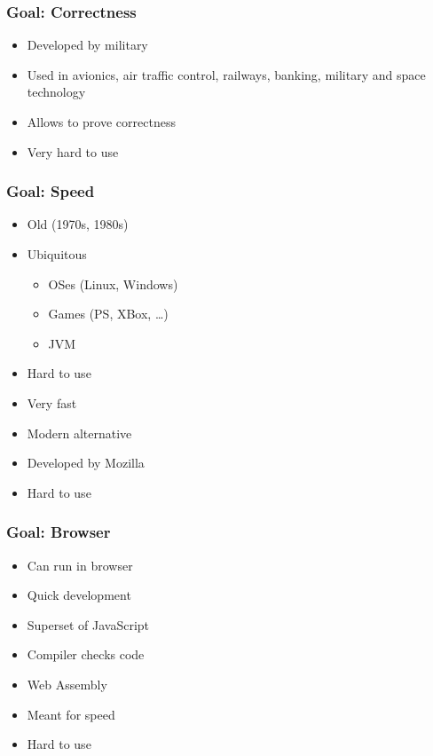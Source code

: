 \begin{frame}
  \frametitle{Goal: Correctness}
  \begin{itemize}
    \item Developed by military
    \item Used in avionics, air traffic control, railways, banking, military and space technology
  \end{itemize}
  \vskip2mm
  \begin{itemize}
    \item Allows to prove correctness
    \item Very hard to use
  \end{itemize}
\end{frame}

\begin{frame}
  \frametitle{Goal: Speed}
  \begin{itemize}
    \item Old (1970s, 1980s)
    \item Ubiquitous
      \begin{itemize}
        \item OSes (Linux, Windows)
        \item Games (PS, XBox, \dots)
        \item JVM
      \end{itemize}
    \item Hard to use
    \item Very fast
  \end{itemize}
  \vskip2mm
  \begin{itemize}
    \item Modern alternative
    \item Developed by Mozilla
    \item Hard to use
  \end{itemize}
\end{frame}

\begin{frame}
  \frametitle{Goal: Browser}
  \begin{itemize}
    \item Can run in browser
    \item Quick development
  \end{itemize}
  \vskip2mm
  \begin{itemize}
    \item Superset of JavaScript
    \item Compiler checks code
  \end{itemize}
  \vskip2mm
  \begin{itemize}
    \item Web Assembly
    \item Meant for speed
    \item Hard to use
  \end{itemize}
\end{frame}

